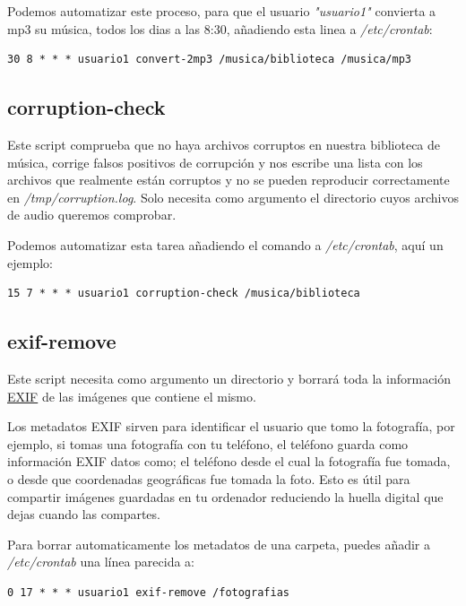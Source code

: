 \documentclass[12pt]{article}
\begin{document}
Podemos automatizar este proceso, para que el usuario \emph{"usuario1"} convierta a mp3 su música, todos los dias a las 8:30, añadiendo esta linea a \emph{/etc/crontab}:

\begin{verbatim}
30 8 * * * usuario1 convert-2mp3 /musica/biblioteca /musica/mp3
\end{verbatim}

\subsection{corruption-check}

Este script comprueba que no haya archivos corruptos en nuestra biblioteca de música, corrige falsos positivos de corrupción y nos escribe una lista con los archivos que realmente están corruptos y no se pueden reproducir correctamente en \emph{/tmp/corruption.log}. Solo necesita como argumento el directorio cuyos archivos de audio queremos comprobar.

Podemos automatizar esta tarea añadiendo el comando a \emph{/etc/crontab}, aquí un ejemplo:

\begin{verbatim}
15 7 * * * usuario1 corruption-check /musica/biblioteca
\end{verbatim}

\subsection{exif-remove}

Este script necesita como argumento un directorio y borrará toda la información \href{https://en.wikipedia.org/wiki/Exif}{EXIF} de las imágenes que contiene el mismo.

Los metadatos EXIF sirven para identificar el usuario que tomo la fotografía, por ejemplo, si tomas una fotografía con tu teléfono, el teléfono guarda como información EXIF datos como; el teléfono desde el cual la fotografía fue tomada, o desde que coordenadas geográficas fue tomada la foto. Esto es útil para compartir imágenes guardadas en tu ordenador reduciendo la huella digital que dejas cuando las compartes.

Para borrar automaticamente los metadatos de una carpeta, puedes añadir a \emph{/etc/crontab} una línea parecida a:

\begin{verbatim}
0 17 * * * usuario1 exif-remove /fotografias
\end{verbatim}
\end{document}
